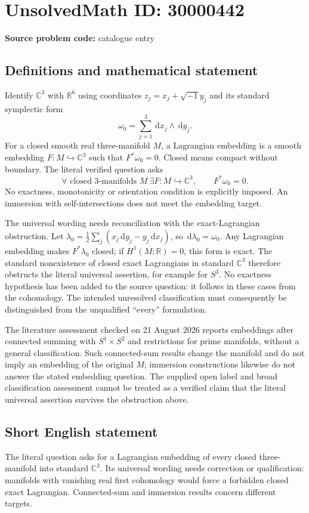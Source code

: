 \documentclass[11pt]{article}
\newcommand{\R}{\mathbb{R}}
\newcommand{\C}{\mathbb{C}}
\newcommand{\dd}{\,\mathrm{d}}
\begin{document}
\section*{UnsolvedMath ID: 30000442}
\textbf{Source problem code:} catalogue entry
\subsection{Definitions and mathematical statement}
Identify $\C^3$ with $\R^6$ using coordinates $z_j=x_j+\sqrt{-1}y_j$ and its standard symplectic form
\[
 \omega_0=\sum_{j=1}^3\dd x_j\wedge\dd y_j.
\]
For a closed smooth real three-manifold $M$, a Lagrangian embedding is a smooth embedding $F:M\hookrightarrow\C^3$ such that $F^*\omega_0=0$. Closed means compact without boundary. The literal verified question asks
\[
 \forall\text{ closed }3\text{-manifolds }M\ \exists F:M\hookrightarrow\C^3,
 \qquad F^*\omega_0=0.
\]
No exactness, monotonicity or orientation condition is explicitly imposed. An immersion with self-intersections does not meet the embedding target.

The universal wording needs reconciliation with the exact-Lagrangian obstruction. Let $\lambda_0=\tfrac12\sum_j(x_j\dd y_j-y_j\dd x_j)$, so $\dd\lambda_0=\omega_0$. Any Lagrangian embedding makes $F^*\lambda_0$ closed; if $H^1(M;\R)=0$, this form is exact. The standard nonexistence of closed exact Lagrangians in standard $\C^3$ therefore obstructs the literal universal assertion, for example for $S^3$. No exactness hypothesis has been added to the source question: it follows in these cases from the cohomology. The intended unresolved classification must consequently be distinguished from the unqualified ``every'' formulation.

The literature assessment checked on 21 August 2026 reports embeddings after connected summing with $S^1\times S^2$ and restrictions for prime manifolds, without a general classification. Such connected-sum results change the manifold and do not imply an embedding of the original $M$; immersion constructions likewise do not answer the stated embedding question. The supplied open label and broad classification assessment cannot be treated as a verified claim that the literal universal assertion survives the obstruction above.
\subsection{Short English statement}
The literal question asks for a Lagrangian embedding of every closed three-manifold into standard $\C^3$. Its universal wording needs correction or qualification: manifolds with vanishing real first cohomology would force a forbidden closed exact Lagrangian. Connected-sum and immersion results concern different targets.
\end{document}
